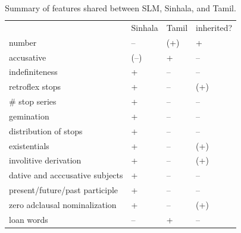 \documentclass[a4paper,10pt]{article}
\begin{document}
\begin{table}
\begin{tabular}{llll}
  & Sinhala & Tamil &inherited?\\
  number & -- & (+) & +\\
  accusative & (--) & + & --  \\
  indefiniteness & + & -- & --  \\
  retroflex stops & + & -- &  (+) \\
  \# stop series & + & -- & --  \\
  gemination & + & -- & --  \\
  distribution of stops & + & -- & -- \\
  existentials & + & -- & (+)\\
  involitive derivation & + & -- & (+) \\
  dative and acccusative subjects & + & -- & --  \\
  present/future/past participle & + & -- & --\\
  zero adclausal nominalization & + & -- & (+) \\
  loan words & -- & + & -- \\
\end{tabular}
\caption{Summary of features shared between SLM, Sinhala, and Tamil.}
\label{tab:summaryfeatures}
\end{table}
 
\end{document}
